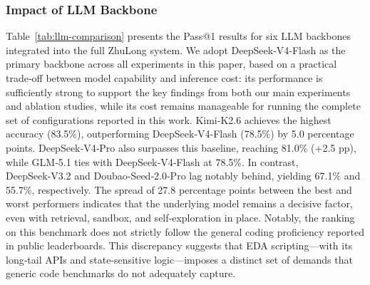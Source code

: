 \documentclass[anonymous, sigconf]{acmart}
\begin{document}
\subsubsection{Impact of LLM Backbone}

Table~\ref{tab:llm-comparison} presents the Pass@1 results for six LLM backbones integrated into the full ZhuLong system. We adopt DeepSeek‑V4‑Flash as the primary backbone across all experiments in this paper, based on a practical trade‑off between model capability and inference cost: its performance is sufficiently strong to support the key findings from both our main experiments and ablation studies, while its cost remains manageable for running the complete set of configurations reported in this work. Kimi‑K2.6 achieves the highest accuracy (83.5\%), outperforming DeepSeek‑V4‑Flash (78.5\%) by 5.0 percentage points. DeepSeek‑V4‑Pro also surpasses this baseline, reaching 81.0\% (+2.5 pp), while GLM‑5.1 ties with DeepSeek‑V4‑Flash at 78.5\%. In contrast, DeepSeek‑V3.2 and Doubao‑Seed‑2.0‑Pro lag notably behind, yielding 67.1\% and 55.7\%, respectively. The spread of 27.8 percentage points between the best and worst performers indicates that the underlying model remains a decisive factor, even with retrieval, sandbox, and self‑exploration in place. Notably, the ranking on this benchmark does not strictly follow the general coding proficiency reported in public leaderboards. This discrepancy suggests that EDA scripting—with its long‑tail APIs and state‑sensitive logic—imposes a distinct set of demands that generic code benchmarks do not adequately capture.
\end{document}

